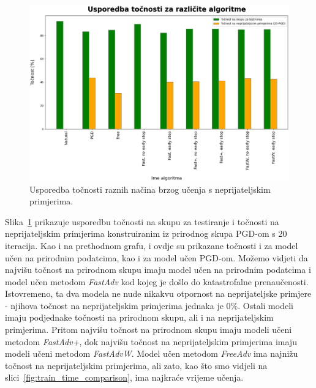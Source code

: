 \documentclass[times, utf8, zavrsni, numeric]{fer}
\begin{document}
\pagebreak
\begin{figure}[htb]
    \centering
    \includegraphics[scale=0.42]{../stats/stats_comparison.png}
    \caption{Usporedba točnosti raznih načina brzog učenja s neprijateljskim primjerima.}
    \label{fig:acc_comparison}
\end{figure}

Slika~\ref{fig:acc_comparison} prikazuje usporedbu točnosti na skupu za testiranje i točnosti na neprijateljskim primjerima konstruiranim iz prirodnog skupa PGD-om s 20 iteracija.
Kao i na prethodnom grafu, i ovdje su prikazane točnosti i za model učen na prirodnim podatcima, kao i za model učen PGD-om.
Možemo vidjeti da najvišu točnost na prirodnom skupu imaju model učen na prirodnim podatcima i model učen metodom \textit{FastAdv} kod kojeg je došlo do katastrofalne prenaučenosti.
Istovremeno, ta dva modela ne nude nikakvu otpornost na neprijateljske primjere - njihova točnost na neprijateljskim primjerima jednaka je $0\%$.
Ostali modeli imaju podjednake točnosti na prirodnom skupu, ali i na neprijateljskim primjerima.
Pritom najvišu točnost na prirodnom skupu imaju modeli učeni metodom \textit{FastAdv+}, dok najvišu točnost na neprijateljskim primjerima imaju modeli učeni metodom \textit{FastAdvW}.
Model učen metodom \textit{FreeAdv} ima najnižu točnost na neprijateljskim primjerima, ali zato, kao što smo vidjeli na slici~\ref{fig:train_time_comparison}, ima najkraće vrijeme učenja.
\end{document}
